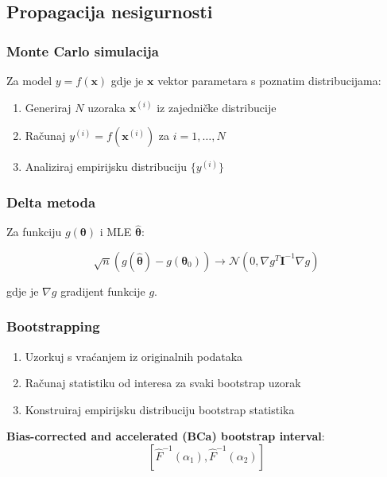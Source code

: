 \documentclass[11pt,oneside]{book}
\begin{document}
\subsection{Propagacija nesigurnosti}

\subsubsection{Monte Carlo simulacija}

Za model $y = f(\mathbf{x})$ gdje je $\mathbf{x}$ vektor parametara s poznatim distribucijama:

\begin{enumerate}
	\item Generiraj $N$ uzoraka $\mathbf{x}^{(i)}$ iz zajedničke distribucije
	\item Računaj $y^{(i)} = f(\mathbf{x}^{(i)})$ za $i = 1, \ldots, N$
	\item Analiziraj empirijsku distribuciju $\{y^{(i)}\}$
\end{enumerate}

\subsubsection{Delta metoda}

Za funkciju $g(\boldsymbol{\theta})$ i MLE $\hat{\boldsymbol{\theta}}$:

\begin{equation}
	\sqrt{n}(g(\hat{\boldsymbol{\theta}}) - g(\boldsymbol{\theta}_0)) \to \mathcal{N}(0, \nabla g^T \mathbf{I}^{-1} \nabla g)
\end{equation}

gdje je $\nabla g$ gradijent funkcije $g$.

\subsubsection{Bootstrapping}

\begin{enumerate}
	\item Uzorkuj s vraćanjem iz originalnih podataka
	\item Računaj statistiku od interesa za svaki bootstrap uzorak
	\item Konstruiraj empirijsku distribuciju bootstrap statistika
\end{enumerate}

\textbf{Bias-corrected and accelerated (BCa) bootstrap interval}:
\begin{equation}
	\left[\hat{F}^{-1}(\alpha_1), \hat{F}^{-1}(\alpha_2)\right]
\end{equation}
\end{document}
